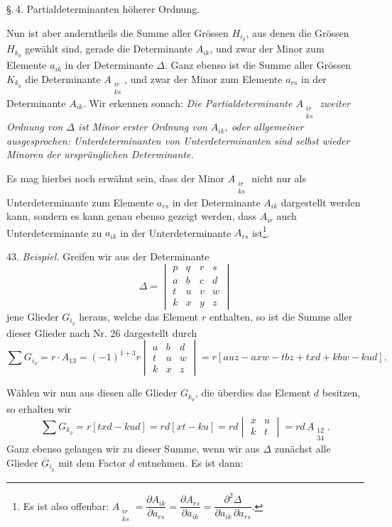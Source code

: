\S.\,4. Partialdeterminanten höherer Ordnung.

Nun ist aber anderntheils die Summe aller Grössen $H_{i_\varrho}$, aus denen die Grössen $H_{k_\varrho}$ gewählt sind, gerade die Determinante $A_{ik}$, und zwar der Minor zum Elemente $a_{ik}$ in der Determinante $\varDelta$. Ganz ebenso ist die Summe aller Grössen $K_{k_\varrho}$ die Determinante $A_{\substack{ir\\ks}}$, und zwar der Minor zum Elemente $a_{rs}$ in der Determinante $A_{ik}$. Wir erkennen sonach: \textit{Die Partialdeterminante $A_{\substack{ir\\ks}}$ zweiter Ordnung von $\varDelta$ ist Minor erster Ordnung von $A_{ik}$, oder allgemeiner ausgesprochen: Unterdeterminanten von Unterdeterminanten sind selbst wieder Minoren der ursprünglichen Determinante.}

Es mag hierbei noch erwähnt sein, dass der Minor $A_{\substack{ir\\ks}}$ nicht nur als Unterdeterminante zum Elemente $a_{rs}$ in der Determinante $A_{ik}$ dargestellt werden kann, sondern es kann genau ebenso gezeigt werden, dass $A_{ir}$ auch Unterdeterminante zu $a_{ik}$ in der Unterdeterminante $A_{rs}$ ist\footnote{Es ist also offenbar: $A_{\substack{ir\\ks}} = \dfrac{\partial A_{ik}}{\partial a_{rs}} = \dfrac{\partial A_{rs}}{\partial a_{ik}} = \dfrac{\partial^2 \varDelta}{\partial a_{ik}\,\partial a_{rs}}$.}.

43. \textit{Beispiel.} Greifen wir aus der Determinante
\[
\varDelta = \begin{vmatrix} p & q & r & s\\ a & b & c & d\\ t & u & v & w\\ k & x & y & z \end{vmatrix}
\]
jene Glieder $G_{i_\varrho}$ heraus, welche das Element $r$ enthalten, so ist die Summe aller dieser Glieder nach Nr. 26 dargestellt durch
\[
\sum G_{i_\varrho} = r \cdot A_{13} = (-1)^{1+3} r \begin{vmatrix} a & b & d\\ t & u & w\\ k & x & z \end{vmatrix}
= r[auz - axw - tbz + txd + kbw - kud].
\]

Wählen wir nun aus diesen alle Glieder $G_{k_\varrho}$, die überdies das Element $d$ besitzen, so erhalten wir
\[
\sum G_{k_\varrho} = r[txd - kud] = rd[xt - ku] = rd \begin{vmatrix} x & u\\ k & t \end{vmatrix} = rd\, A_{\substack{12\\34}}.
\]
Ganz ebenso gelangen wir zu dieser Summe, wenn wir aus $\varDelta$ zunächst alle Glieder $\overline{G}_{i_\varrho}$ mit dem Factor $d$ entnehmen. Es ist dann:


